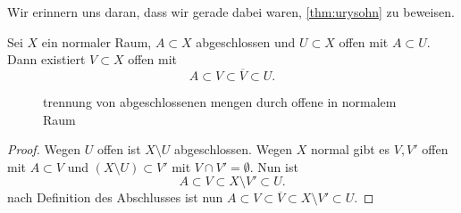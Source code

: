 Wir erinnern uns daran, dass wir gerade dabei waren, \autoref{thm:urysohn} zu beweisen.
\begin{lemma}\label{trennung-von-mengen-in-normalem-raum-für-urysohn-lemma}
    Sei $X$ ein normaler Raum,  $A\subset X$ abgeschlossen und $U\subset X$ offen mit  $A\subset U$. Dann existiert $V\subset X$ offen mit
    \[
    A\subset V\subset \overline{V}\subset U
    .\] 
\end{lemma}
\begin{figure}[ht]
    \centering
    \caption{trennung von abgeschlossenen mengen durch offene in normalem Raum}
    \label{fig:trennung-von-abgeschlossenen-mengen-durch-offene-in-normalem-raum}
\end{figure}
\begin{proof}
    Wegen $U$ offen ist  $X\setminus U$ abgeschlossen. Wegen $X$ normal gibt es  $V,V'$ offen mit  $A\subset V$ und $(X\setminus U)\subset V'$ mit $V\cap V'=\emptyset$. Nun ist
    \[
    A\subset V\subset X\setminus V' \subset U
    .\] 
    nach Definition des Abschlusses ist nun $A\subset V\subset \overline{V} \subset X\setminus V' \subset U$.
\end{proof}

